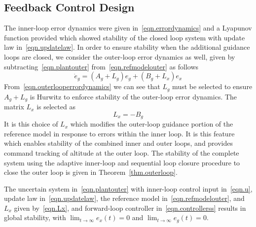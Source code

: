 \documentclass[]{../sty/aiaa-tc}
\theoremstyle{examplestyle}
\begin{document}
  \subsection{Feedback Control Design}

  The inner-loop error dynamics were given in\ \eqref{eqn.errordynamics} and a Lyapunov function provided which showed stability of the closed loop system with update law in\ \eqref{eqn.updatelaw}.
  In order to ensure stability when the additional guidance loops are closed, we consider the outer-loop error dynamics as well, given by subtracting\ \eqref{eqn.plantouter} from\ \eqref{eqn.refmodelouter} as follows
  \begin{equation}
    \label{eqn.outerlooperrordynamics}
    \dot{e}_{g} = (A_{g} + L_{g})e_{g} + (B_{g} + L_{x})e_{x}
  \end{equation}
  From\ \eqref{eqn.outerlooperrordynamics} we can see that $L_{g}$ must be selected to ensure $A_{g}+L_{g}$ is Hurwitz to enforce stability of the outer-loop error dynamics.
  The matrix $L_{x}$ is selected as
  \begin{equation}
    \label{eqn.Lx}
    L_{x} = -B_{g}
  \end{equation}
  It is this choice of $L_{x}$ which modifies the outer-loop guidance portion of the reference model in response to errors within the inner loop.
  It is this feature which enables stability of the combined inner and outer loops, and provides command tracking of altitude at the outer loop.
  The stability of the complete system using the adaptive inner-loop and sequential loop closure procedure to close the outer loop is given in Theorem~\ref{thm.outerloop}.

  \begin{thm-dan}\label{thm.outerloop}
    The uncertain system in\ \eqref{eqn.plantouter} with inner-loop control input in\ \eqref{eqn.u}, update law in\ \eqref{eqn.updatelaw}, the reference model in\ \eqref{eqn.refmodelouter}, and $L_{x}$ given by\ \eqref{eqn.Lx}, and forward-loop controller in\ \eqref{eqn.controllerss} results in global stability, with $\lim_{t\rightarrow\infty}e_{x}(t)=0$ and $\lim_{t\rightarrow\infty}e_{g}(t)=0$.
  \end{thm-dan}
\end{document}
